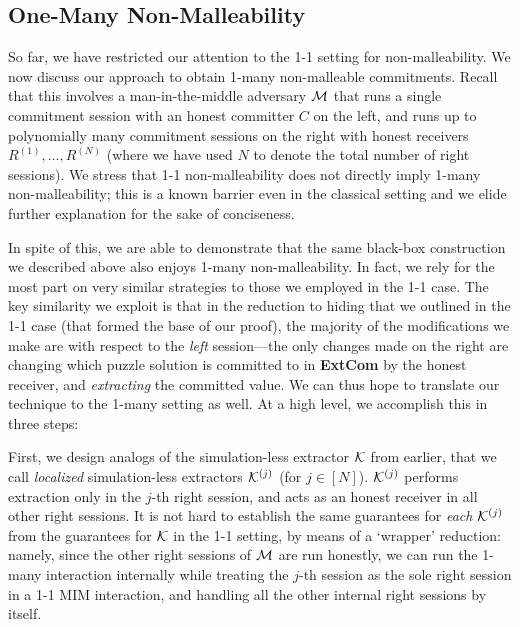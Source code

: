 \subsection{One-Many Non-Malleability}
\label{sec:overview:NM:1-many}

So far, we have restricted our attention to the 1-1 setting for non-malleability. We now discuss our approach to obtain 1-many non-malleable commitments. Recall that this involves a man-in-the-middle adversary $\mathcal{M}$ that runs a single commitment session with an honest committer $C$ on the left, and runs up to polynomially many commitment sessions on the right with honest receivers $R^{(1)},\dots,R^{(N)}$ (where we have used $N$ to denote the total number of right sessions). We stress that 1-1 non-malleability does not directly imply 1-many non-malleability; this is a known barrier even in the classical setting and we elide further explanation for the sake of conciseness.  

In spite of this, we are able to demonstrate that the same black-box construction we described above also enjoys 1-many non-malleability. In fact, we rely for the most part on very similar strategies to those we employed in the 1-1 case. The key similarity we exploit is that in the reduction to hiding that we outlined in the 1-1 case (that formed the base of our proof), the majority of the modifications we make are with respect to the {\em left} session---the only changes made on the right are changing which puzzle solution is committed to in {\bf ExtCom} by the honest receiver, and {\em extracting} the committed value. We can thus hope to translate our technique to the 1-many setting as well. %
At a high level, we accomplish this in three steps: 

 First, we design analogs of the simulation-less extractor $\mathcal{K}$ from earlier, that we call {\em localized} simulation-less extractors $\mathcal{K}^{(j)}$ (for $j \in [N]$). $\mathcal{K}^{(j)}$ performs extraction only in the $j$-th right session, and acts as an honest receiver in all other right sessions. It is not hard to establish the same guarantees for {\em each} $\mathcal{K}^{(j)}$ from the guarantees for $\mathcal{K}$ in the 1-1 setting, by means of a `wrapper' reduction: namely, since the other right sessions of $\mathcal{M}$ are run honestly, we can run the 1-many interaction internally while treating the $j$-th session as the sole right session in a 1-1 MIM interaction, and handling all the other internal right sessions by itself. 

